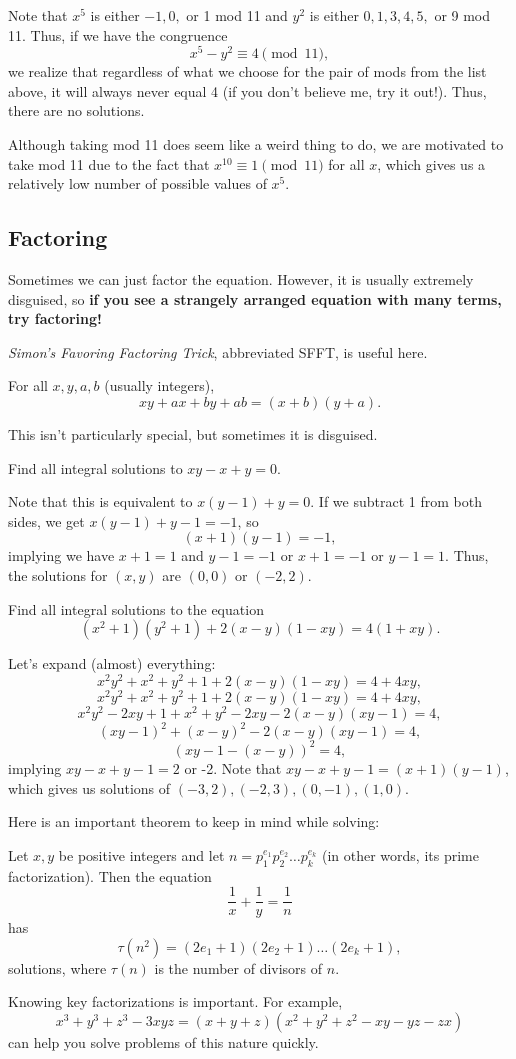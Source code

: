 \documentclass[mast]{lucky}
\begin{document}
\begin{sol}
Note that $x^5$ is either $-1,0,$ or 1 mod 11 and $y^2$ is either $0,1,3,4,5,$ or 9 mod 11. Thus, if we have the congruence
$$x^5-y^2\equiv 4\pmod{11},$$
we realize that regardless of what we choose for the pair of mods from the list above, it will always never equal 4 (if you don't believe me, try it out!). Thus, there are no solutions.
\end{sol}
\begin{remark}
Although taking mod 11 does seem like a weird thing to do, we are motivated to take mod 11 due to the fact that $x^{10}\equiv1\pmod{11}$ for all $x$, which gives us a relatively low number of possible values of $x^5$.
\end{remark}
\subsection{Factoring}
Sometimes we can just factor the equation. However, it is usually extremely disguised, so \textbf{if you see a strangely arranged equation with many terms, try factoring!}

\emph{Simon's Favoring Factoring Trick}, abbreviated SFFT, is useful here.
\begin{theo}[SFFT]
For all $x,y,a,b$ (usually integers),
$$xy+ax+by+ab=(x+b)(y+a).$$
\end{theo}
This isn't particularly special, but sometimes it is disguised.
\begin{exam}
Find all integral solutions to $xy-x+y=0$.
\end{exam}
\begin{sol}
Note that this is equivalent to $x(y-1)+y=0$. If we subtract 1 from both sides, we get $x(y-1)+y-1=-1$, so
$$(x+1)(y-1)=-1,$$
implying we have $x+1=1$ and $y-1=-1$ or $x+1=-1$ or $y-1=1$. Thus, the solutions for $(x,y)$ are $\boxed{(0,0)}$ or $\boxed{(-2,2)}$.
\end{sol}
\begin{exam}[Titu]
Find all integral solutions to the equation
$$(x^2+1)(y^2+1)+2(x-y)(1-xy)=4(1+xy).$$
\end{exam}
\begin{sol}
Let's expand (almost) everything:
$$x^2y^2+x^2+y^2+1+2(x-y)(1-xy)=4+4xy,$$
$$x^2y^2+x^2+y^2+1+2(x-y)(1-xy)=4+4xy,$$
$$x^2y^2-2xy+1+x^2+y^2-2xy-2(x-y)(xy-1)=4,$$
$$(xy-1)^2+(x-y)^2-2(x-y)(xy-1)=4,$$
$$(xy-1-(x-y))^2=4,$$
implying $xy-x+y-1=2$ or -2. Note that $xy-x+y-1=(x+1)(y-1)$, which gives us solutions of $\boxed{(-3,2),(-2,3),(0,-1),(1,0)}$.
\end{sol}
Here is an important theorem to keep in mind while solving:
\begin{theo}
Let $x,y$ be positive integers and let $n=p_1^{e_1}p_2^{e_2}\ldots p_k^{e_k}$ (in other words, its prime factorization). Then the equation
$$\frac{1}{x}+\frac{1}{y}=\frac{1}{n}$$
has
$$\tau(n^2) = (2e_1+1)(2e_2+1)\ldots(2e_k+1),$$
solutions, where $\tau(n)$ is the number of divisors of $n$.
\end{theo}
Knowing key factorizations is important. For example,
$$x^3+y^3+z^3-3xyz=(x+y+z)(x^2+y^2+z^2-xy-yz-zx)$$
can help you solve problems of this nature quickly.
\end{document}
